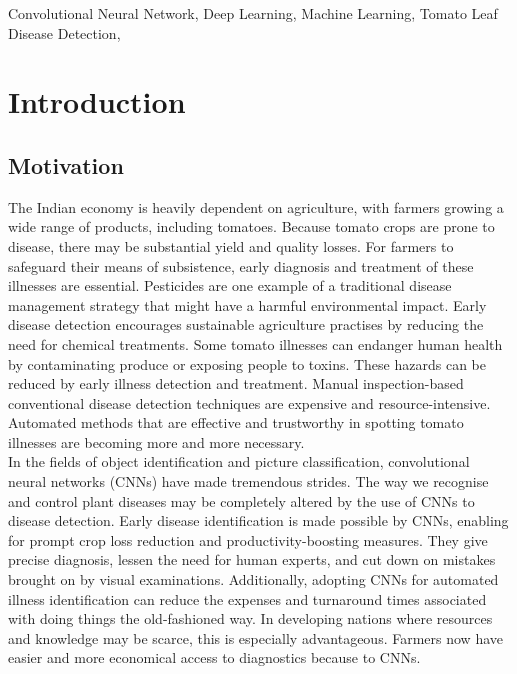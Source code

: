 \documentclass[conference]{IEEEtran}
\begin{document}
\begin{IEEEkeywords}
Convolutional Neural Network, Deep Learning, Machine Learning, Tomato Leaf Disease Detection, 
\end{IEEEkeywords}
 
\IEEEpeerreviewmaketitle



\section{Introduction}



\subsection{Motivation}
The Indian economy is heavily dependent on agriculture, with farmers growing a wide range of products, including tomatoes. Because tomato crops are prone to disease, there may be substantial yield and quality losses. For farmers to safeguard their means of subsistence, early diagnosis and treatment of these illnesses are essential. Pesticides are one example of a traditional disease management strategy that might have a harmful environmental impact. Early disease detection encourages sustainable agriculture practises by reducing the need for chemical treatments. Some tomato illnesses can endanger human health by contaminating produce or exposing people to toxins. These hazards can be reduced by early illness detection and treatment. Manual inspection-based conventional disease detection techniques are expensive and resource-intensive. Automated methods that are effective and trustworthy in spotting tomato illnesses are becoming more and more necessary. \\ 

In the fields of object identification and picture classification, convolutional neural networks (CNNs) have made tremendous strides. The way we recognise and control plant diseases may be completely altered by the use of CNNs to disease detection. Early disease identification is made possible by CNNs, enabling for prompt crop loss reduction and productivity-boosting measures. They give precise diagnosis, lessen the need for human experts, and cut down on mistakes brought on by visual examinations. Additionally, adopting CNNs for automated illness identification can reduce the expenses and turnaround times associated with doing things the old-fashioned way. In developing nations where resources and knowledge may be scarce, this is especially advantageous. Farmers now have easier and more economical access to diagnostics because to CNNs.\\ 
\end{document}
